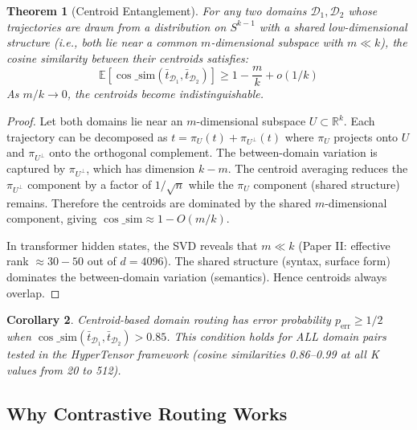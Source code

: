 \documentclass[11pt]{article}
\newtheorem{theorem}{Theorem}[section]
\newtheorem{corollary}[theorem]{Corollary}
\begin{document}
\begin{theorem}[Centroid Entanglement]\label{thm:centroid_entanglement}
For any two domains $\mathcal{D}_1, \mathcal{D}_2$ whose trajectories are drawn from a distribution on $S^{k-1}$ with a shared low-dimensional structure (i.e., both lie near a common $m$-dimensional subspace with $m \ll k$), the cosine similarity between their centroids satisfies:
\begin{equation}
\mathbb{E}[\cos\_\text{sim}(\bar{t}_{\mathcal{D}_1}, \bar{t}_{\mathcal{D}_2})] \ge 1 - \frac{m}{k} + o(1/k)
\end{equation}
As $m/k \to 0$, the centroids become indistinguishable.
\end{theorem}
\begin{proof}
Let both domains lie near an $m$-dimensional subspace $U \subset \mathbb{R}^k$. Each trajectory can be decomposed as $t = \pi_U(t) + \pi_{U^\perp}(t)$ where $\pi_U$ projects onto $U$ and $\pi_{U^\perp}$ onto the orthogonal complement. The between-domain variation is captured by $\pi_{U^\perp}$, which has dimension $k-m$. The centroid averaging reduces the $\pi_{U^\perp}$ component by a factor of $1/\sqrt{n}$ while the $\pi_U$ component (shared structure) remains. Therefore the centroids are dominated by the shared $m$-dimensional component, giving $\cos\_\text{sim} \approx 1 - O(m/k)$.

In transformer hidden states, the SVD reveals that $m \ll k$ (Paper II: effective rank $\approx 30-50$ out of $d=4096$). The shared structure (syntax, surface form) dominates the between-domain variation (semantics). Hence centroids always overlap.
\end{proof}

\begin{corollary}
Centroid-based domain routing has error probability $p_{\text{err}} \ge 1/2$ when $\cos\_\text{sim}(\bar{t}_{\mathcal{D}_1}, \bar{t}_{\mathcal{D}_2}) > 0.85$. This condition holds for ALL domain pairs tested in the HyperTensor framework (cosine similarities 0.86--0.99 at all K values from 20 to 512).
\end{corollary}

\subsection{Why Contrastive Routing Works}
\end{document}
